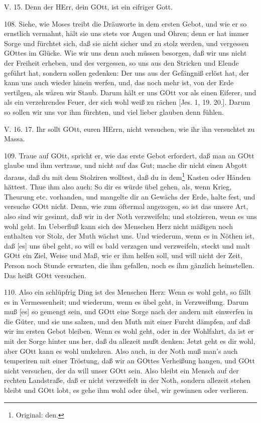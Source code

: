 \begin{schriftzitat}
V. 15. Denn der HErr, dein GOtt, ist ein eifriger Gott.
\end{schriftzitat}

108. Siehe, wie Moses treibt die Dräuworte in dem ersten Gebot, und wie er so ernstlich vermahnt, hält sie uns stets vor Augen und Ohren; denn er hat immer Sorge und fürchtet sich, daß sie nicht sicher und zu stolz werden, und vergessen GOttes im Glücke. Wie wir uns denn auch müssen besorgen, daß wir uns nicht der Freiheit erheben, und des vergessen, so uns aus den Stricken und Elende geführt hat, sondern sollen gedenken: Der uns aus der Gefängniß erlöst hat, der kann uns auch wieder hinein werfen, und, das noch mehr ist, von der Erde vertilgen, als wären wir Staub. Darum hält er uns GOtt vor als einen Eiferer, und als ein verzehrendes Feuer, der sich wohl weiß zu rächen [Jes. 1, 19. 20.]. Darum so sollen wir uns vor ihm fürchten, und viel lieber glauben denn fühlen.

\begin{schriftzitat}
V. 16. 17. Ihr sollt GOtt, euren HErrn, nicht versuchen, wie ihr ihn versuchtet zu Massa.
\end{schriftzitat}

109. Traue auf GOtt, spricht er, wie das erste Gebot erfordert, daß man an GOtt glaube und ihm vertraue, und nicht auf das Gut; mache dir nicht einen Abgott daraus, daß du mit dem Stolziren wolltest, daß du in dem\footnote{Original: den.} Kasten oder Händen hättest. Thue ihm also auch: So dir es würde übel gehen, als, wenn Krieg, Theurung etc. vorhanden, und mangelte dir an Gewächs der Erde, halte fest, und versuche GOtt nicht. Denn, wie zum öftermal angezogen, so ist das unsere Art, also sind wir gesinnt, daß wir in der Noth verzweifeln; und stolzieren, wenn es uns wohl geht. Im Ueberfluß kann sich des Menschen Herz nicht mäßigen noch enthalten vor Stolz, der Muth wächst uns. Und wiederum, wenn es in Nöthen ist, daß [es] uns übel geht, so will es bald verzagen und verzweifeln, steckt und malt GOtt ein Ziel, Weise und Maß, wie er ihm helfen soll, und will nicht der Zeit, Person noch Stunde erwarten, die ihm gefallen, noch es ihm gänzlich heimstellen. Das heißt GOtt versuchen.

110. Also ein schlüpfrig Ding ist des Menschen Herz: Wenn es wohl geht, so fällt es in Vermessenheit; und wiederum, wenn es übel geht, in Verzweiflung. Darum muß [es] so gemengt sein, und GOtt eine Sorge nach der andern mit einwerfen in die Güter, und sie uns salzen, und den Muth mit einer Furcht dämpfen, auf daß wir im ersten Gebot bleiben. Wenn es wohl geht, oder in der Wohlfahrt, da ist er mit der Sorge hinter uns her, daß du allezeit mußt denken: Jetzt geht es dir wohl, aber GOtt kann es wohl umkehren. Also auch, in der Noth muß man’s auch temperiren mit einer Tröstung, daß wir an GOttes Verheißung hangen, und GOtt nicht versuchen, der da will unser GOtt sein. Also bleibt ein Mensch auf der rechten Landstraße, daß er nicht verzweifelt in der Noth, sondern allezeit stehen bleibt und GOtt lobt, es gehe ihm wohl oder übel, wir gewinnen oder verlieren.

